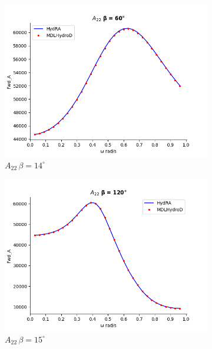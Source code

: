 \begin{figure}[H]
\begin{subfigure}[b]{0.45\textwidth}
        \includegraphics[width=\textwidth]{plots/kcs/added_mass/A22 _BETA_60.png}
        \caption{$A_{22} \, \beta = 14^{\circ}$}
    \end{subfigure}
    \begin{subfigure}[b]{0.45\textwidth}
        \includegraphics[width=\textwidth]{plots/kcs/added_mass/A22_BETA_120.png}
        \caption{$A_{22} \, \beta = 15^{\circ}$}
    \end{subfigure}
    \begin{subfigure}[b]{0.45\textwidth}

\end{subfigure}
\end{figure}
